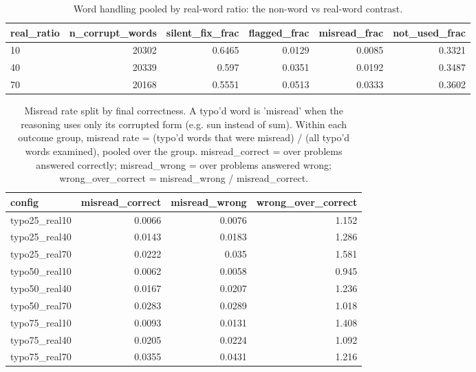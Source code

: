 \documentclass[11pt]{article}
\begin{document}
\begin{table}[H]
\centering
\caption{Word handling pooled by real-word ratio: the non-word vs real-word contrast.}
\small
\begin{adjustbox}{max width=\textwidth}
\begin{tabular}{lrrrrr}
\toprule
\textbf{real\_ratio} & \textbf{n\_corrupt\_words} & \textbf{silent\_fix\_frac} & \textbf{flagged\_frac} & \textbf{misread\_frac} & \textbf{not\_used\_frac} \\
\midrule
10 & 20302 & 0.6465 & 0.0129 & 0.0085 & 0.3321 \\
40 & 20339 & 0.597 & 0.0351 & 0.0192 & 0.3487 \\
70 & 20168 & 0.5551 & 0.0513 & 0.0333 & 0.3602 \\
\bottomrule
\end{tabular}
\end{adjustbox}
\end{table}

\begin{table}[H]
\centering
\caption{Misread rate split by final correctness. A typo'd word is 'misread' when the reasoning uses only its corrupted form (e.g. sun instead of sum). Within each outcome group, misread rate = (typo'd words that were misread) / (all typo'd words examined), pooled over the group. misread\_correct = over problems answered correctly; misread\_wrong = over problems answered wrong; wrong\_over\_correct = misread\_wrong / misread\_correct.}
\small
\begin{adjustbox}{max width=\textwidth}
\begin{tabular}{lrrr}
\toprule
\textbf{config} & \textbf{misread\_correct} & \textbf{misread\_wrong} & \textbf{wrong\_over\_correct} \\
\midrule
typo25\_real10 & 0.0066 & 0.0076 & 1.152 \\
typo25\_real40 & 0.0143 & 0.0183 & 1.286 \\
typo25\_real70 & 0.0222 & 0.035 & 1.581 \\
typo50\_real10 & 0.0062 & 0.0058 & 0.945 \\
typo50\_real40 & 0.0167 & 0.0207 & 1.236 \\
typo50\_real70 & 0.0283 & 0.0289 & 1.018 \\
typo75\_real10 & 0.0093 & 0.0131 & 1.408 \\
typo75\_real40 & 0.0205 & 0.0224 & 1.092 \\
typo75\_real70 & 0.0355 & 0.0431 & 1.216 \\
\bottomrule
\end{tabular}
\end{adjustbox}
\end{table}
\end{document}
